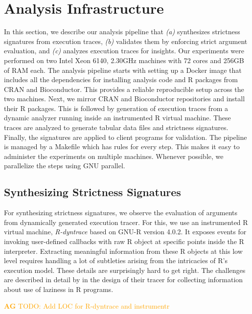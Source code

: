 \documentclass[review,nonacm,screen,acmsmall,anonymous=true]{acmart}
\newcommand{\authorcomment}[3]{\xspace\textcolor{#1}{{\bf #2} #3}\xspace}
\newcommand{\AG}[1]{\authorcomment{orange}{AG}{#1}}
\begin{document}
\section{Analysis Infrastructure}
In this section, we describe our analysis pipeline that \emph{(a)} synthesizes
strictness signatures from execution traces, \emph{(b)} validates them by
enforcing strict argument evaluation, and \emph{(c)} analyzes execution traces
for insights. Our experiments were performed on two Intel Xeon 6140, 2.30GHz
machines with 72 cores and 256GB of RAM each. The analysis pipeline starts with
setting up a Docker image that includes all the dependencies for installing
analysis code and R packages from CRAN and Bioconductor. This provides a
reliable reproducible setup across the two machines. Next, we mirror CRAN and
Bioconductor\cite{bioc} repositories and install their R packages. This is
followed by generation of execution traces from a dynamic analyzer running
inside an instrumented R virtual machine. These traces are analyzed to generate
tabular data files and strictness signatures. Finally, the signatures are
applied to client programs for validation. The pipeline is managed by a Makefile
which has rules for every step. This makes it easy to administer the experiments
on multiple machines. Whenever possible, we parallelize the steps using GNU
parallel\cite{tange2011a}.

\subsection{Synthesizing Strictness Signatures}

For synthesizing strictness signatures, we observe the evaluation of arguments
from dynamically generated execution tracer. For this, we use an instrumented R
virtual machine, \emph{R-dyntrace} \citet{oopsla19b} based on GNU-R version
4.0.2. It exposes events for invoking user-defined callbacks with raw R object
at specific points inside the R interpreter. Extracting meaningful information
from these R objects at this low level requires handling a lot of subtleties
arising from the intricacies of R's execution model. These details are
surprisingly hard to get right. The challenges are described in detail by
\cite{oopsla19b} in the design of their tracer for collecting information about
use of laziness in R programs.

\AG{TODO: Add LOC for R-dyntrace and instrumentr}
\end{document}
